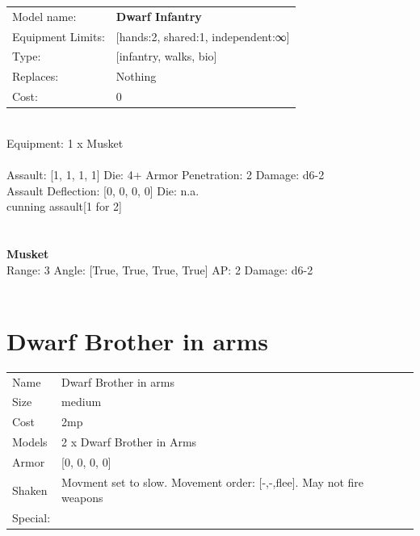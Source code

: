 \noindent
\begin{tabular}{ll}
Model name: &{\bf Dwarf Infantry } \\
Equipment Limits: &[hands:2, shared:1, independent:∞] \\
Type: &[infantry, walks, bio] \\
Replaces: &Nothing \\
Cost: & 0\\
\end{tabular}
\ \\
Equipment: 1 x Musket \\
\ \\
Assault: [1, 1, 1, 1] Die: 4+ Armor Penetration: 2 Damage: d6-2 \\
Assault Deflection: [0, 0, 0, 0] Die: n.a.\\
\indent cunning assault[1 for 2]\\ 
 
\ \\

\ \\
{\bf Musket } \\



Range: 3  Angle: [True, True, True, True] AP: 2 Damage: d6-2 \\




 
\ \\













\clearpage

\section{ Dwarf Brother in arms }

\begin{tabular}{ll}
  Name & Dwarf Brother in arms \\
  Size & medium\\
  Cost & 2mp\\
  Models & 2 x Dwarf Brother in Arms\\
  Armor & [0, 0, 0, 0]\\
  Shaken & Movment set to slow. Movement order: [-,-,flee]. May not fire weapons\\
  Special: \\
\end{tabular}


